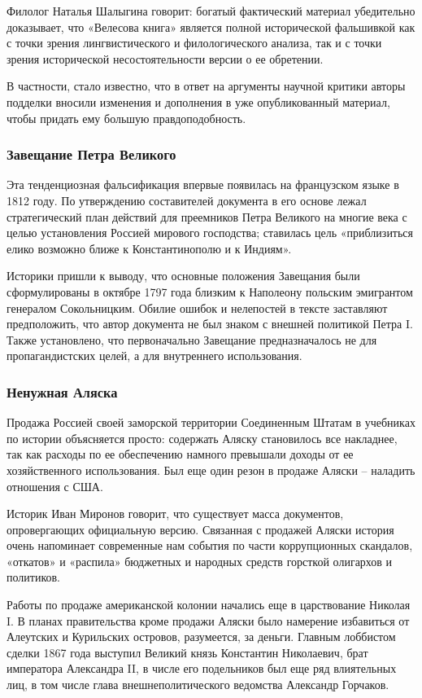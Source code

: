 Филолог Наталья Шалыгина говорит: богатый фактический материал убедительно
доказывает, что «Велесова книга» является полной исторической фальшивкой как с
точки зрения лингвистического и филологического анализа, так и с точки зрения
исторической несостоятельности версии о ее обретении.

В частности, стало известно, что в ответ на аргументы научной критики авторы
подделки вносили изменения и дополнения в уже опубликованный материал, чтобы
придать ему большую правдоподобность.

\subsubsection{Завещание Петра Великого}

Эта тенденциозная фальсификация впервые появилась на французском языке в 1812
году. По утверждению составителей документа в его основе лежал стратегический
план действий для преемников Петра Великого на многие века с целью установления
Россией мирового господства; ставилась цель «приблизиться елико возможно ближе
к Константинополю и к Индиям».

Историки пришли к выводу, что основные положения Завещания были сформулированы
в октябре 1797 года близким к Наполеону польским эмигрантом генералом
Сокольницким. Обилие ошибок и нелепостей в тексте заставляют предположить, что
автор документа не был знаком с внешней политикой Петра I. Также установлено,
что первоначально Завещание предназначалось не для пропагандистских целей, а
для внутреннего использования.

\subsubsection{Ненужная Аляска}

Продажа Россией своей заморской территории Соединенным Штатам в учебниках по
истории объясняется просто: содержать Аляску становилось все накладнее, так как
расходы по ее обеспечению намного превышали доходы от ее хозяйственного
использования. Был еще один резон в продаже Аляски – наладить отношения с США.

Историк Иван Миронов говорит, что существует масса документов, опровергающих
официальную версию. Связанная с продажей Аляски история очень напоминает
современные нам события по части коррупционных скандалов, «откатов» и «распила»
бюджетных и народных средств горсткой олигархов и политиков.

Работы по продаже американской колонии начались еще в царствование Николая I. В
планах правительства кроме продажи Аляски было намерение избавиться от
Алеутских и Курильских островов, разумеется, за деньги. Главным лоббистом
сделки 1867 года выступил Великий князь Константин Николаевич, брат императора
Александра II, в числе его подельников был еще ряд влиятельных лиц, в том числе
глава внешнеполитического ведомства Александр Горчаков.

